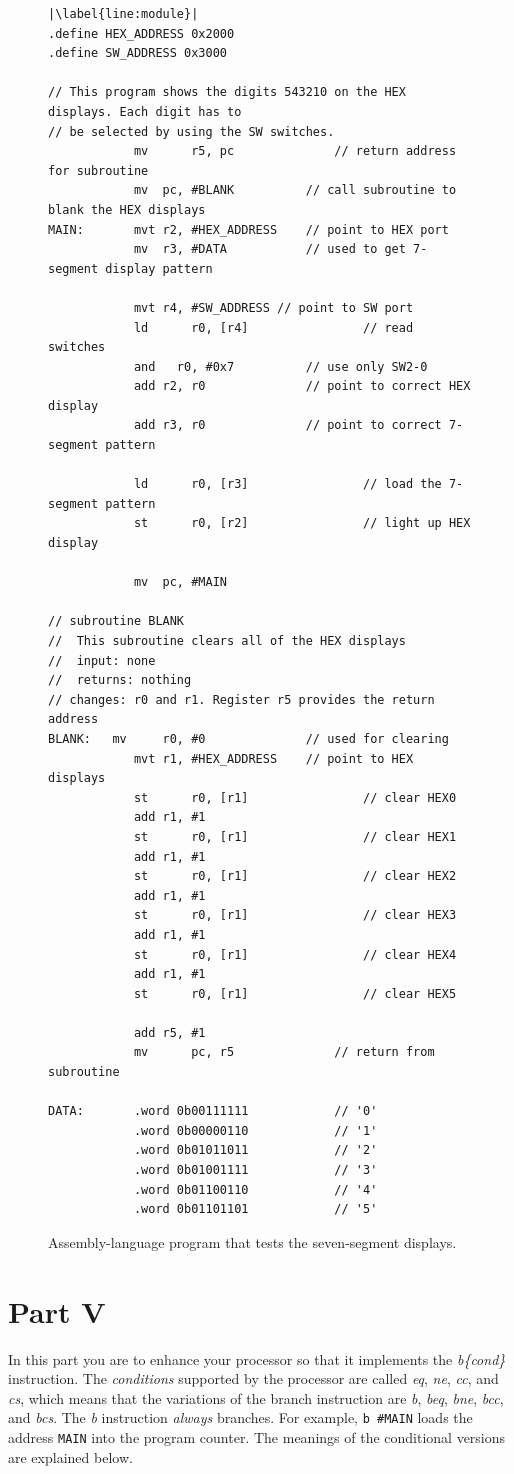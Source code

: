 \documentclass[epsfig,10pt,fullpage]{article}
\begin{document}
\lstset{language=ASM,numbers=none,escapechar=|}
\begin{figure}[H]
\begin{center}
\begin{minipage}[h]{15 cm}
\begin{lstlisting}[name=proc]
|\label{line:module}|
.define HEX_ADDRESS 0x2000
.define SW_ADDRESS 0x3000

// This program shows the digits 543210 on the HEX displays. Each digit has to
// be selected by using the SW switches.
			mv		r5, pc				// return address for subroutine
			mv 	pc, #BLANK			// call subroutine to blank the HEX displays
MAIN:		mvt	r2, #HEX_ADDRESS	// point to HEX port
			mv 	r3, #DATA			// used to get 7-segment display pattern

			mvt	r4, #SW_ADDRESS	// point to SW port
			ld		r0, [r4]				// read switches
			and   r0, #0x7          // use only SW2-0
			add	r2, r0				// point to correct HEX display
			add	r3, r0				// point to correct 7-segment pattern

			ld		r0, [r3]				// load the 7-segment pattern
			st		r0, [r2]				// light up HEX display

			mv 	pc, #MAIN

// subroutine BLANK
// 	This subroutine clears all of the HEX displays
//	input: none
//	returns: nothing
// changes: r0 and r1. Register r5 provides the return address
BLANK:   mv 	r0, #0				// used for clearing
			mvt	r1, #HEX_ADDRESS	// point to HEX displays
			st		r0, [r1]				// clear HEX0
			add	r1, #1
			st		r0, [r1]				// clear HEX1
			add	r1, #1
			st		r0, [r1]				// clear HEX2
			add	r1, #1
			st		r0, [r1]				// clear HEX3
			add	r1, #1
			st		r0, [r1]				// clear HEX4
			add	r1, #1
			st		r0, [r1]				// clear HEX5

			add	r5, #1
			mv		pc, r5				// return from subroutine

DATA:		.word 0b00111111			// '0'
			.word 0b00000110			// '1'
			.word 0b01011011			// '2'
			.word 0b01001111			// '3'
			.word 0b01100110			// '4'
			.word 0b01101101			// '5'
\end{lstlisting}
\end{minipage}
\caption{Assembly-language program that tests the seven-segment displays.}
\label{fig:7segs}
\end{center}
\end{figure}

\section*{Part V}
In this part you are to enhance your processor so that it implements the {\it b\{cond\}}
instruction.  The {\it conditions} supported by the processor are called 
{\it eq}, {\it ne}, {\it cc}, and {\it cs}, which means that the variations of the branch
instruction are {\it b}, {\it beq}, {\it bne}, {\it bcc}, and {\it bcs}. The {\it b}
instruction {\it always} branches. For example, \texttt{b \#MAIN} loads the address
\texttt{MAIN} into the program counter. The meanings of the conditional versions are 
explained below.
\end{document}
